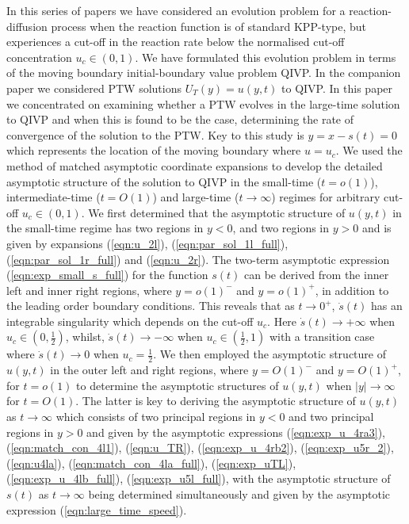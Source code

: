 \documentclass[11pt,a4paper]{article}
\newcommand{\eeref}[1]{(\ref{eqn:#1})}
\begin{document}
In this series of papers we have considered an evolution problem for a reaction-diffusion process when the reaction function is of standard KPP-type, but experiences a cut-off in the reaction rate below the normalised cut-off concentration $u_c \in (0,1)$. We have formulated this evolution problem in terms of the moving boundary initial-boundary value problem QIVP. 
In the companion paper we considered PTW solutions $U_T(y)=u(y,t)$ to QIVP. 
In this paper  we concentrated on examining whether a PTW evolves in the large-time solution to QIVP and when this is found to be the  case, determining the rate of convergence of the solution to the PTW.
Key to this study is   $y=x-s(t)=0$ which represents the location of the moving boundary where $u=u_c$. 
%
We used the  method of matched asymptotic  coordinate
expansions to develop the detailed asymptotic structure of the solution to QIVP in the small-time ($t=o(1)$), intermediate-time ($t=O(1)$) and large-time ($t\to \infty$) regimes for arbitrary cut-off $u_c \in (0,1)$. 
%
We first determined that the asymptotic structure of $u(y,t)$ in the small-time regime
has  two   regions in $y<0$, and two  regions in $y>0$ 
and is given by  expansions \eeref{u_2l},
\eeref{par_sol_1l_full},
\eeref{par_sol_1r_full}
and
 \eeref{u_2r}.  
  The two-term asymptotic expression \eeref{exp_small_s_full} for the function $s(t)$   can be derived from the inner left and inner right regions, where $y=o(1)^-$ and $y=o(1)^+$, in addition to the leading order boundary conditions. 
This reveals that as $t \to 0^+$, $\dot{s}(t)$
has an integrable singularity which depends on the cut-off $u_c$.
Here $\dot{s}(t) \to + \infty$ when $u_c \in (0,\frac{1}{2})$, whilst, $\dot{s}(t) \to - \infty$ when $u_c \in (\frac{1}{2},1)$ with a transition case where $\dot{s}(t) \to 0$ when $u_c =\frac{1}{2}$. 
We then employed the asymptotic structure of $u(y,t)$ in the outer left and right 
 regions, where $y=O(1)^-$ and $y=O(1)^+$,  for $t=o(1)$ to determine the asymptotic structures of $u(y,t)$ when $ \lvert y \rvert \to \infty$ for  $t=O(1)$. 
The latter  is key to deriving the asymptotic structure of $u(y,t)$ 
 as 
$t\to \infty$ which consists of    two principal   regions in $y<0$ and two principal  regions in $y>0$ and given by the asymptotic expressions \eeref{exp_u_4ra3}, \eeref{match_con_4l1}, \eeref{u_TR}, \eeref{exp_u_4rb2}, \eeref{exp_u5r_2},  
\eeref{u4la}, \eeref{match_con_4la_full}, \eeref{exp_uTL}, \eeref{exp_u_4lb_full}, \eeref{exp_u5l_full}, with the asymptotic structure of $s(t)$ as $t\to \infty$ being determined simultaneously and given by the asymptotic expression \eeref{large_time_speed}.
\end{document}
